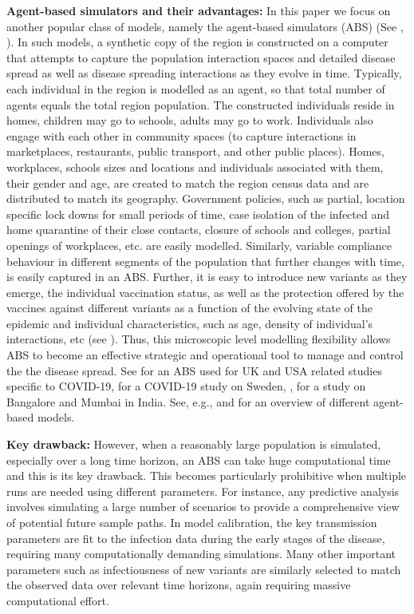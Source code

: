 \documentclass{article}
\theoremstyle{definition}
\begin{document}
{\noindent \bf Agent-based simulators and their advantages:} In this paper we focus on another popular class of models, namely 
the agent-based simulators (ABS) (See \cite{hunter2017taxonomy}, \cite{ferguson2020report}). 
In such models, a  synthetic copy of the region is constructed on a computer
that attempts to  capture the population interaction spaces and detailed disease spread as well as disease spreading interactions
as they evolve in time.
Typically, each individual in the region is modelled as
an agent, so that total number of agents equals
the total region population. 
The constructed individuals reside in homes, children may go 
to schools, adults may go to work. Individuals also engage with each other in
community spaces (to capture interactions in marketplaces, restaurants,
public transport,
and other public places).
Homes, workplaces, schools sizes and locations and  individuals associated with them,  
their gender and age,  are created to match the region census 
data and are distributed to match its geography. Government policies, such as partial, location specific  lock downs for small periods of time,
case isolation of the infected and home  quarantine of their close contacts,
closure of schools and colleges, partial openings of workplaces, etc. are easily modelled. Similarly, variable compliance behaviour in different segments of 
the population that further changes with time, is easily captured
in an ABS.  Further, it is easy 
to introduce new variants as they emerge,  the individual vaccination status, as well as the protection offered by the vaccines
against different variants as a function of
the evolving state of the epidemic and individual characteristics, such as age, density of individual's interactions, etc (see \cite{May_report_2021}). 
Thus, this microscopic level  modelling flexibility allows ABS to become an effective strategic and operational tool
to manage and control the  the disease spread.  
 See \cite{ferguson2020report} for an ABS used 
for UK and USA related studies specific to COVID-19,
\cite{gardner2020intervention} for a COVID-19 study on Sweden, \cite{City_Simulator_IISc_TIFR_2020}, \cite{October_report_2020}
for a study on Bangalore and Mumbai in India.
See, e.g.,   \cite{halloran2008modeling}  and \cite{hunter2017taxonomy} for an
overview of different agent-based models.

\bigskip 

{\noindent \bf Key drawback:} However, when a reasonably large population is simulated, especially over a long time horizon, an ABS can take huge computational time 
and this is its key drawback.  This becomes particularly
prohibitive when multiple runs are needed using different parameters. 
For instance, any predictive analysis involves simulating a large number of scenarios
to provide a comprehensive view of potential future sample paths. 
In model calibration, 
the key transmission parameters  are fit to
the infection data during the early stages of the disease, requiring many 
computationally demanding simulations. Many other important 
parameters such as infectiousness of new variants
are similarly selected to match the observed data over relevant time horizons, again requiring massive computational
effort. 
\end{document}
